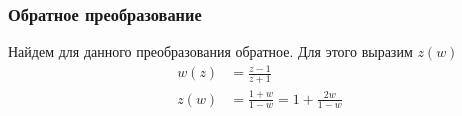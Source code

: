 \begin{frame}\frametitle{Обратное преобразование}
  Найдем для данного преобразования обратное.
  Для этого выразим \(z(w)\)
  \begin{align*}
    w(z) &= \frac{z-1}{z+1} \\
    z(w) &= \frac{1+w}{1-w} = 1 + \frac{2w}{1-w}
  \end{align*}
\end{frame}
